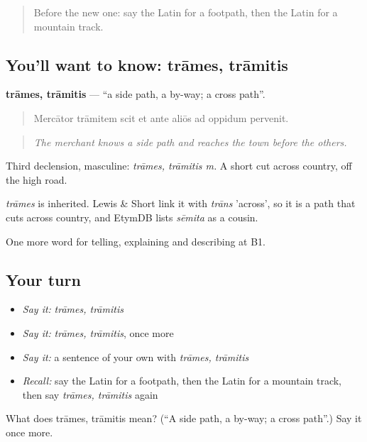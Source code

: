 \begin{quote}
Before the new one: say the Latin for a footpath, then the Latin for a mountain track.
\end{quote}

\subsection*{You'll want to know: trāmes, trāmitis}
\textbf{trāmes, trāmitis} — \textquotedblleft{}a side path, a by-way; a cross path\textquotedblright{}.

\begin{quote}
Mercātor trāmitem scit et ante aliōs ad oppidum pervenit.
\end{quote}

\begin{quote}
\emph{The merchant knows a side path and reaches the town before the others.}
\end{quote}

Third declension, masculine: \emph{trāmes, trāmitis m.} A short cut across country, off the high road.

\begin{cousinweb}
\emph{trāmes} is inherited. Lewis \& Short link it with \emph{trāns} 'across', so it is a path that cuts across country, and EtymDB lists \emph{sēmita} as a cousin.
\end{cousinweb}

\begin{grammarlens}[title={What you've built}]
One more word for telling, explaining and describing at B1.
\end{grammarlens}

\subsection*{Your turn}
\begin{itemize}
\raggedright
  \item \emph{Say it:} \emph{trāmes, trāmitis}
  \item \emph{Say it:} \emph{trāmes, trāmitis}, once more
  \item \emph{Say it:} a sentence of your own with \emph{trāmes, trāmitis}
  \item \emph{Recall:} say the Latin for a footpath, then the Latin for a mountain track, then say \emph{trāmes, trāmitis} again
\end{itemize}

\begin{tcolorbox}[breakable,colback=teal!4,colframe=teal!35!black,title={Before you move on}]
What does trāmes, trāmitis mean? (\textquotedblleft{}A side path, a by-way; a cross path\textquotedblright{}.) Say it once more.
\end{tcolorbox}
